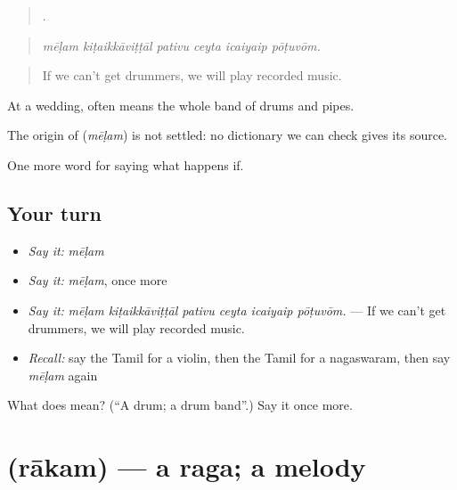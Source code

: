 \begin{quote}
     .
\end{quote}

\begin{quote}
\emph{mēḷam kiṭaikkāviṭṭāl pativu ceyta icaiyaip pōṭuvōm.}
\end{quote}

\begin{quote}
If we can't get drummers, we will play recorded music.
\end{quote}

At a wedding,  often means the whole band of drums and pipes.

\begin{cousinweb}
The origin of \textbf{} (\emph{mēḷam}) is not settled: no dictionary we can check gives its source.
\end{cousinweb}

\begin{grammarlens}[title={What you've built}]
One more word for saying what happens if.
\end{grammarlens}

\subsection*{Your turn}
\begin{itemize}
\raggedright
  \item \emph{Say it:} \emph{mēḷam}
  \item \emph{Say it:} \emph{mēḷam}, once more
  \item \emph{Say it:} \emph{mēḷam kiṭaikkāviṭṭāl pativu ceyta icaiyaip pōṭuvōm.} — If we can't get drummers, we will play recorded music.
  \item \emph{Recall:} say the Tamil for a violin, then the Tamil for a nagaswaram, then say \emph{mēḷam} again
\end{itemize}

\begin{tcolorbox}[breakable,colback=teal!4,colframe=teal!35!black,title={Before you move on}]
What does  mean? (\textquotedblleft{}A drum; a drum band\textquotedblright{}.) Say it once more.
\end{tcolorbox}
\section[\texorpdfstring{\ta{ராகம்} (rākam)}{ராகம் (rākam)}]{ (rākam) — a raga; a melody}

